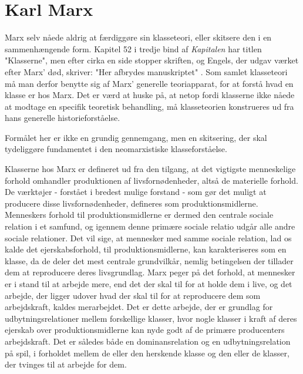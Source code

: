 \section{Karl Marx \label{2_marx}}

Marx selv nåede aldrig at færdiggøre sin klasseteori, eller skitsere den i en sammenhængende form. Kapitel 52 i tredje bind af \emph{Kapitalen} har titlen "Klasserne", men efter cirka en side stopper skriften, og Engels, der udgav værket efter Marx' død, skriver: "Her afbrydes manuskriptet" \parencite[22]{Harrits2014}. Som samlet klasseteori må man derfor benytte sig af Marx' generelle teoriapparat, for at forstå hvad en klasse er hos Marx. Det er værd at huske på, at netop fordi klasserne ikke nåede at modtage en specifik teoretisk behandling, må klasseteorien konstrueres ud fra hans generelle historieforståelse.

Formålet her er ikke en grundig gennemgang, men en skitsering, der skal tydeliggøre fundamentet i den neomarxistiske klasseforståelse.

Klasserne hos Marx er defineret ud fra den tilgang, at det vigtigste menneskelige forhold omhandler produktionen af livsfornødenheder, altså de materielle forhold. De værktøjer - forstået i bredest mulige forstand - som gør det muligt at producere disse livsfornødenheder, defineres som produktionsmidlerne. Menneskers forhold til produktionsmidlerne er dermed den centrale sociale relation i et samfund, og igennem denne primære sociale relatio udgår alle andre sociale relationer. Det vil sige, at mennesker med samme sociale relation, lad os kalde det ejerskabsforhold, til produktionsmidlerne, kan karakteriseres som en klasse, da de deler det mest centrale grundvilkår, nemlig betingelsen der tillader dem at reproducere deres livsgrundlag. Marx peger på det forhold, at mennesker er i stand til at arbejde mere, end det der skal til for at holde dem i live, og det arbejde, der ligger udover hvad der skal til for at reproducere dem som arbejdskraft, kaldes merarbejdet. Det er dette arbejde, der er grundlag for udbytningsrelationer mellem forskellige klasser, hvor nogle klasser i kraft af deres ejerskab over produktionsmidlerne kan nyde godt af de primære producenters arbejdskraft. Det er således både en dominansrelation og en udbytningsrelation på spil, i forholdet mellem de eller den herskende klasse og den eller de klasser, der tvinges til at arbejde for dem.

